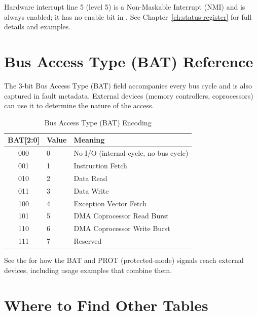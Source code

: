 Hardware interrupt line 5 (level 5) is a Non-Maskable Interrupt (NMI) and is always enabled; it has no enable bit in
. See Chapter~\ref{ch:status-register} for full details and examples.

\section{Bus Access Type (BAT) Reference}
\label{sec:qr-bat}

The 3-bit Bus Access Type (BAT) field accompanies every bus cycle and is also captured in fault metadata. External
devices (memory controllers, coprocessors) can use it to determine the nature of the access.

\begin{table}[H]
	\centering
	\begin{tabular}{clp{7.5cm}}
		\toprule
		\textbf{BAT[2:0]} & \textbf{Value} & \textbf{Meaning}                      \\
		\midrule
		000               & 0              & No I/O (internal cycle, no bus cycle) \\
		001               & 1              & Instruction Fetch                     \\
		010               & 2              & Data Read                             \\
		011               & 3              & Data Write                            \\
		100               & 4              & Exception Vector Fetch                \\
		101               & 5              & DMA Coprocessor Read Burst            \\
		110               & 6              & DMA Coprocessor Write Burst           \\
		111               & 7              & Reserved                              \\
		\bottomrule
	\end{tabular}
	\caption{Bus Access Type (BAT) Encoding}
	\label{tab:bat-quick-ref}
\end{table}

See the \hwmanual{} for how the BAT and PROT (protected-mode) signals reach external devices, including usage examples
that combine them.

\section{Where to Find Other Tables}
\label{sec:qr-where-to-find}

